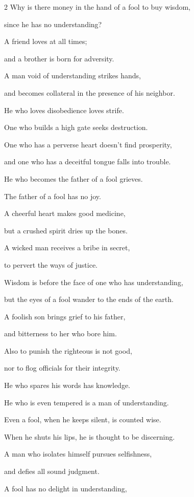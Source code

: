 \begin{multicols}{2}
\myverse{}Why is there money in the hand of a fool to buy wisdom,

since he has no understanding?


\myverse{}A friend loves at all times;

and a brother is born for adversity.


\myverse{}A man void of understanding strikes hands,

and becomes collateral in the presence of his neighbor.


\myverse{}He who loves disobedience loves strife.

One who builds a high gate seeks destruction.


\myverse{}One who has a perverse heart doesn’t find prosperity,

and one who has a deceitful tongue falls into trouble.


\myverse{}He who becomes the father of a fool grieves.

The father of a fool has no joy.


\myverse{}A cheerful heart makes good medicine,

but a crushed spirit dries up the bones.


\myverse{}A wicked man receives a bribe in secret,

to pervert the ways of justice.


\myverse{}Wisdom is before the face of one who has understanding,

but the eyes of a fool wander to the ends of the earth.


\myverse{}A foolish son brings grief to his father,

and bitterness to her who bore him.


\myverse{}Also to punish the righteous is not good,

nor to flog officials for their integrity.


\myverse{}He who spares his words has knowledge.

He who is even tempered is a man of understanding.


\myverse{}Even a fool, when he keeps silent, is counted wise.

When he shuts his lips, he is thought to be discerning.


\mychapter{} \myverse*{}A man who isolates himself pursues selfishness,

and defies all sound judgment.


\myverse{}A fool has no delight in understanding,


\end{multicols}
